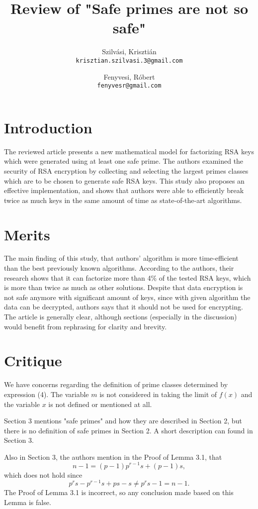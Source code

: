 \documentclass[11 pt,a4paper,english]{article}
\title{Review of "Safe primes are not so safe"}
\author{
	Szilvási, Krisztián\\
	\texttt{krisztian.szilvasi.3@gmail.com}
	\and
	Fenyvesi, Róbert\\
	\texttt{fenyvesr@gmail.com}
}
\begin{document}
\maketitle

\newpage

\section{Introduction}
The reviewed article \cite{safeprimes} presents a new mathematical model for factorizing RSA keys which were generated using at least one safe prime. 
The authors examined the security of RSA encryption by collecting and selecting the largest primes classes which are to be chosen to generate safe RSA keys. 
This study also proposes an effective implementation, and shows that authors were able to efficiently break twice as much keys in the same amount of time as state-of-the-art algorithms. 


\section{Merits}
The main finding of this study, that authors' algorithm is more time-efficient than the best previously known algorithms. According to the authors, their research shows that it can factorize more than 4\% of the tested RSA keys, which is more than twice as much as other solutions. 
Despite that data encryption is not safe anymore with significant amount of keys, since with given algorithm the data can be decrypted, authors says that it should not be used for encrypting. 
The article is generally clear, although sections (especially in the discussion) would benefit from rephrasing for clarity and brevity.


\section{Critique}

We have concerns regarding the definition of prime classes determined by expression (4). The variable $m$ is not considered in taking the limit of $f(x)$ and the variable $x$ is not defined or mentioned at all.

Section 3 mentions "safe primes" and how they are described in Section 2, but there is no definition of safe primes in Section 2. A short description can found in Section 3.

Also in Section 3, the authors mention in the Proof of Lemma 3.1, that $$n-1=(p-1)p^{r-1}s+(p-1)s,$$ which does not hold since $$p^rs-p^{r-1}s+ps-s \neq p^rs-1=n-1.$$ The Proof of Lemma 3.1 is incorrect, so any conclusion made based on this Lemma is false.
\end{document}
